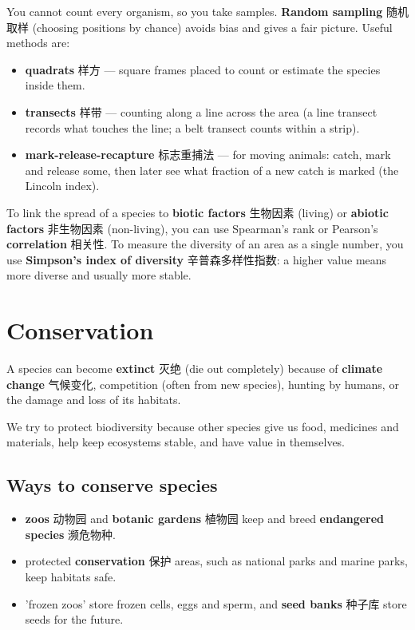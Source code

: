 \documentclass[11pt]{article}
\begin{document}
You cannot count every organism, so you take samples. \textbf{Random sampling} 随机取样 (choosing positions by chance) avoids bias and gives a fair picture. Useful methods are:

\begin{itemize}
\item \textbf{quadrats} 样方 — square frames placed to count or estimate the species inside them.

\item \textbf{transects} 样带 — counting along a line across the area (a line transect records what touches the line; a belt transect counts within a strip).

\item \textbf{mark-release-recapture} 标志重捕法 — for moving animals: catch, mark and release some, then later see what fraction of a new catch is marked (the Lincoln index).

\end{itemize}

To link the spread of a species to \textbf{biotic factors} 生物因素 (living) or \textbf{abiotic factors} 非生物因素 (non-living), you can use Spearman's rank or Pearson's \textbf{correlation} 相关性. To measure the diversity of an area as a single number, you use \textbf{Simpson's index of diversity} 辛普森多样性指数: a higher value means more diverse and usually more stable.

\section*{Conservation}

A species can become \textbf{extinct} 灭绝 (die out completely) because of \textbf{climate change} 气候变化, competition (often from new species), hunting by humans, or the damage and loss of its habitats.

We try to protect biodiversity because other species give us food, medicines and materials, help keep ecosystems stable, and have value in themselves.

\subsection*{Ways to conserve species}

\begin{itemize}
\item \textbf{zoos} 动物园 and \textbf{botanic gardens} 植物园 keep and breed \textbf{endangered species} 濒危物种.

\item protected \textbf{conservation} 保护 areas, such as national parks and marine parks, keep habitats safe.

\item 'frozen zoos' store frozen cells, eggs and sperm, and \textbf{seed banks} 种子库 store seeds for the future.

\end{itemize}
\end{document}
